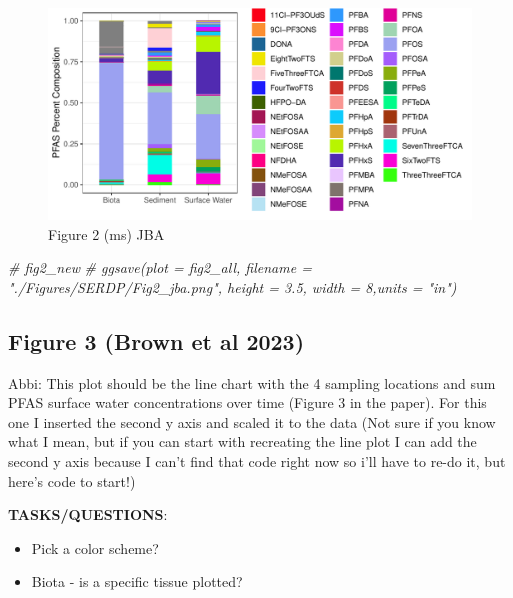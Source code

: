\documentclass[
]{article}
\newenvironment{Shaded}{\begin{snugshade}}{\end{snugshade}}
\newcommand{\CommentTok}[1]{\textcolor[rgb]{0.56,0.35,0.01}{\textit{#1}}}
\providecommand{\tightlist}{%
  \setlength{\itemsep}{0pt}\setlength{\parskip}{0pt}}
\begin{document}
\begin{figure}

{\centering \includegraphics{CompleteDatasets_rerun_files/figure-latex/Figure 2 JBA-1} 

}

\caption{Figure 2 (ms) JBA}\label{fig:Figure 2 JBA}
\end{figure}

\begin{Shaded}
\begin{Highlighting}[]
\CommentTok{\# fig2\_new}
\CommentTok{\# ggsave(plot = fig2\_all, filename = "./Figures/SERDP/Fig2\_jba.png", height = 3.5, width = 8,units = "in")}
\end{Highlighting}
\end{Shaded}

\subsection{Figure 3 (Brown et al
2023)}\label{figure-3-brown-et-al-2023}

Abbi: This plot should be the line chart with the 4 sampling locations
and sum PFAS surface water concentrations over time (Figure 3 in the
paper). For this one I inserted the second y axis and scaled it to the
data (Not sure if you know what I mean, but if you can start with
recreating the line plot I can add the second y axis because I can't
find that code right now so i'll have to re-do it, but here's code to
start!)

\textbf{TASKS/QUESTIONS}:

\begin{itemize}
\tightlist
\item
  Pick a color scheme?
\item
  Biota - is a specific tissue plotted?
\end{itemize}
\end{document}
